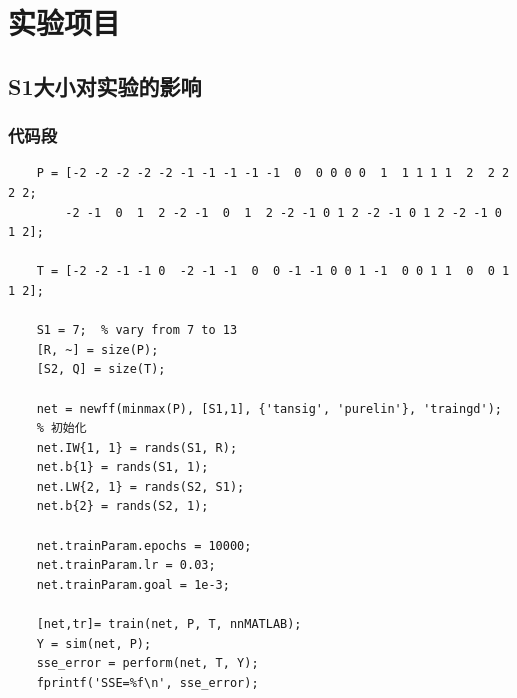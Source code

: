 \documentclass[UTF8]{article}
\begin{document}
\section{实验项目}
\subsection{S1大小对实验的影响}
\subsubsection{代码段}
\begin{lstlisting}
    P = [-2 -2 -2 -2 -2 -1 -1 -1 -1 -1  0  0 0 0 0  1  1 1 1 1  2  2 2 2 2;
        -2 -1  0  1  2 -2 -1  0  1  2 -2 -1 0 1 2 -2 -1 0 1 2 -2 -1 0 1 2];

    T = [-2 -2 -1 -1 0  -2 -1 -1  0  0 -1 -1 0 0 1 -1  0 0 1 1  0  0 1 1 2];

    S1 = 7;  % vary from 7 to 13
    [R, ~] = size(P);
    [S2, Q] = size(T);

    net = newff(minmax(P), [S1,1], {'tansig', 'purelin'}, 'traingd'); 
    % 初始化
    net.IW{1, 1} = rands(S1, R);
    net.b{1} = rands(S1, 1);
    net.LW{2, 1} = rands(S2, S1);
    net.b{2} = rands(S2, 1);

    net.trainParam.epochs = 10000;
    net.trainParam.lr = 0.03;
    net.trainParam.goal = 1e-3;

    [net,tr]= train(net, P, T, nnMATLAB); 
    Y = sim(net, P);
    sse_error = perform(net, T, Y);
    fprintf('SSE=%f\n', sse_error);
\end{lstlisting}
\end{document}
